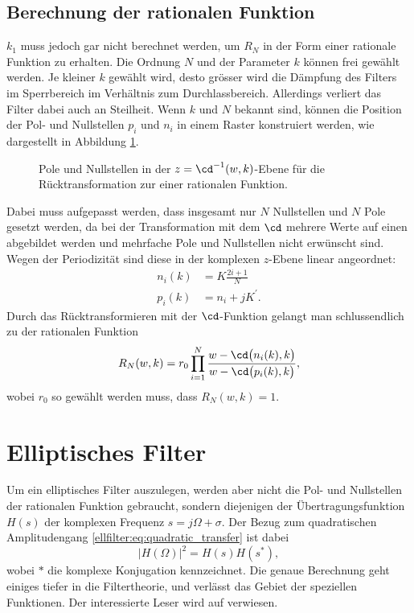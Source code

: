 \subsection{Berechnung der rationalen Funktion}

$k_1$ muss jedoch gar nicht berechnet werden, um $R_N$ in der Form einer rationale Funktion zu erhalten.
Die Ordnung $N$ und der Parameter $k$ können frei gewählt werden.
Je kleiner $k$ gewählt wird, desto grösser wird die Dämpfung des Filters im Sperrbereich im Verhältnis zum Durchlassbereich.
Allerdings verliert das Filter dabei auch an Steilheit.
Wenn $k$ und $N$ bekannt sind, können die Position der Pol- und Nullstellen $p_i$ und $n_i$ in einem Raster konstruiert werden, wie dargestellt in Abbildung \ref{ellfilter:fig:pn}.
\begin{figure}
    \centering
    
    \caption{
        Pole und Nullstellen in der $z = \cd^{-1}(w, k)$-Ebene für die Rücktransformation zur einer rationalen Funktion.
    }
    \label{ellfilter:fig:pn}
\end{figure}
Dabei muss aufgepasst werden, dass insgesamt nur $N$ Nullstellen und $N$ Pole gesetzt werden, da bei der Transformation mit dem $\cd$ mehrere Werte auf einen abgebildet werden und mehrfache Pole und Nullstellen nicht erwünscht sind.
Wegen der Periodizität sind diese in der komplexen $z$-Ebene linear angeordnet:
\begin{align}
    n_i(k) &= K\frac{2i+1}{N} \\
    p_i(k) &= n_i + jK^\prime.
\end{align}
Durch das Rücktransformieren mit der $\cd$-Funktion gelangt man schlussendlich zu der rationalen Funktion
\begin{equation}
    R_N(w, k) = r_0 \prod_{i=1}^N \frac{w - \cd \big(n_i(k), k \big)}{w - \cd \big(p_i(k), k \big)},
\end{equation}
wobei $r_0$ so gewählt werden muss, dass $R_N(w, k) = 1$.

\section{Elliptisches Filter}

Um ein elliptisches Filter auszulegen, werden aber nicht die Pol- und Nullstellen der rationalen Funktion gebraucht, sondern diejenigen der Übertragungsfunktion $H(s)$ der komplexen Frequenz $s = j\Omega + \sigma$.
Der Bezug zum quadratischen Amplitudengang \eqref{ellfilter:eq:quadratic_transfer} ist dabei
\begin{equation}
    |H(\Omega)|^2 = H(s) H(s^*),
\end{equation}
wobei $*$ die komplexe Konjugation kennzeichnet.
Die genaue Berechnung geht einiges tiefer in die Filtertheorie, und verlässt das Gebiet der speziellen Funktionen.
Der interessierte Leser wird auf \cite[chapter~5]{ellfilter:bib:orfanidis} verwiesen.
